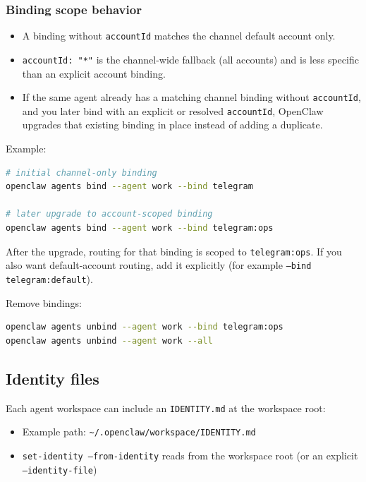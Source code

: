 \subsubsection{Binding scope behavior}


\begin{itemize}
  \item A binding without \texttt{accountId} matches the channel default account only.
  \item \texttt{accountId: "*"} is the channel-wide fallback (all accounts) and is less specific than an explicit account binding.
  \item If the same agent already has a matching channel binding without \texttt{accountId}, and you later bind with an explicit or resolved \texttt{accountId}, OpenClaw upgrades that existing binding in place instead of adding a duplicate.
\end{itemize}


Example:

\begin{lstlisting}[language=bash]
# initial channel-only binding
openclaw agents bind --agent work --bind telegram

# later upgrade to account-scoped binding
openclaw agents bind --agent work --bind telegram:ops
\end{lstlisting}


After the upgrade, routing for that binding is scoped to \texttt{telegram:ops}. If you also want default-account routing, add it explicitly (for example \texttt{--bind telegram:default}).

Remove bindings:

\begin{lstlisting}[language=bash]
openclaw agents unbind --agent work --bind telegram:ops
openclaw agents unbind --agent work --all
\end{lstlisting}


\subsection{Identity files}


Each agent workspace can include an \texttt{IDENTITY.md} at the workspace root:

\begin{itemize}
  \item Example path: \texttt{\textasciitilde{}/.openclaw/workspace/IDENTITY.md}
  \item \texttt{set-identity --from-identity} reads from the workspace root (or an explicit \texttt{--identity-file})
\end{itemize}


